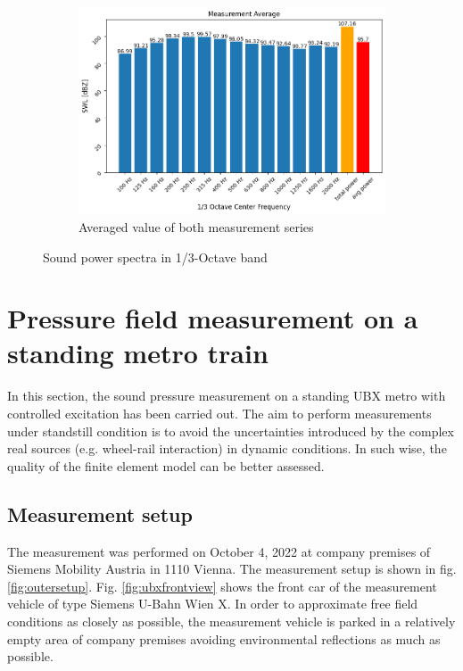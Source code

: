\begin{figure}[H]\ContinuedFloat
     \centering
     \begin{subfigure}[b]{0.9\textwidth}
         \centering
         \includegraphics[width=\linewidth]{fig/SWL_average.png}
         \caption{Averaged value of both measurement series}
         \label{fig:average_SWL}
     \end{subfigure}
     
        \caption{Sound power spectra in 1/3-Octave band}
        \label{fig:SWL}
\end{figure}


\section{Pressure field measurement on a standing metro train}

In this section, the sound pressure measurement on a standing UBX metro with controlled excitation has been carried out. The aim to perform measurements under standstill condition is to avoid the uncertainties introduced by the complex real sources (e.g. wheel-rail interaction) in dynamic conditions. In such wise, the quality of the finite element model can be better assessed.

\subsection*{Measurement setup}

The measurement was performed on October 4, 2022 at company premises of Siemens Mobility Austria in 1110 Vienna. The measurement setup is shown in fig. \ref{fig:outersetup}. Fig. \ref{fig:ubxfrontview} shows the front car of the measurement vehicle of type Siemens U-Bahn Wien X. In order to approximate free field conditions as closely as possible, the measurement vehicle is parked in a relatively empty area of company premises avoiding environmental reflections as much as possible.

